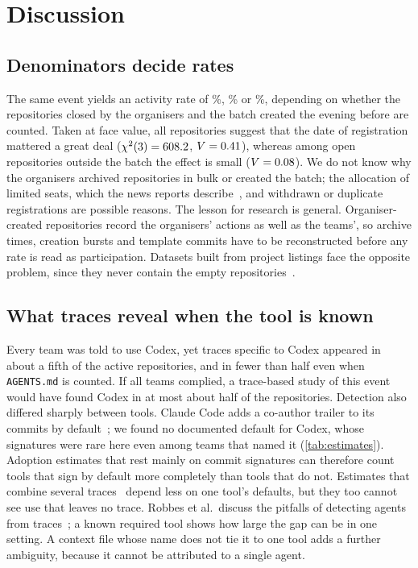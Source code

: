 \documentclass{article}
\begin{document}
\section{Discussion}\label{sec:discussion}

\subsection{Denominators decide rates}
The same event yields an activity rate of \NRqOneActivePct\%, \NRqOneActiveOfOpenPct\% or \NRqOneActiveOfOpenNonbatchPct\%, depending on whether the repositories closed by the organisers and the batch created the evening before are counted. Taken at face value, all repositories suggest that the date of registration mattered a great deal ($\chi^2(\num{3}) = \num{608.2}$, $V = \num{0.41}$), whereas among open repositories outside the batch the effect is small ($V = \num{0.08}$). We do not know why the organisers archived repositories in bulk or created the batch; the allocation of limited seats, which the news reports describe~\cite{qumash2026queue,ulys2026survival}, and withdrawn or duplicate registrations are possible reasons. The lesson for research is general. Organiser-created repositories record the organisers' actions as well as the teams', so archive times, creation bursts and template commits have to be reconstructed before any rate is read as participation. Datasets built from project listings face the opposite problem, since they never contain the empty repositories~\cite{imam2021secretlife,mahmoud2022oneoff}.

\subsection{What traces reveal when the tool is known}
Every team was told to use Codex, yet traces specific to Codex appeared in about a fifth of the active repositories, and in fewer than half even when \texttt{AGENTS.md} is counted. If all teams complied, a trace-based study of this event would have found Codex in at most about half of the repositories. Detection also differed sharply between tools. Claude Code adds a co-author trailer to its commits by default~\cite{claudecode2026attribution}; we found no documented default for Codex, whose signatures were rare here even among teams that named it (\cref{tab:estimates}). Adoption estimates that rest mainly on commit signatures can therefore count tools that sign by default more completely than tools that do not. Estimates that combine several traces~\cite{robbes2026agenticmuch} depend less on one tool's defaults, but they too cannot see use that leaves no trace. Robbes et al.\ discuss the pitfalls of detecting agents from traces~\cite{robbes2026heuristics}; a known required tool shows how large the gap can be in one setting. A context file whose name does not tie it to one tool adds a further ambiguity, because it cannot be attributed to a single agent.
\end{document}

